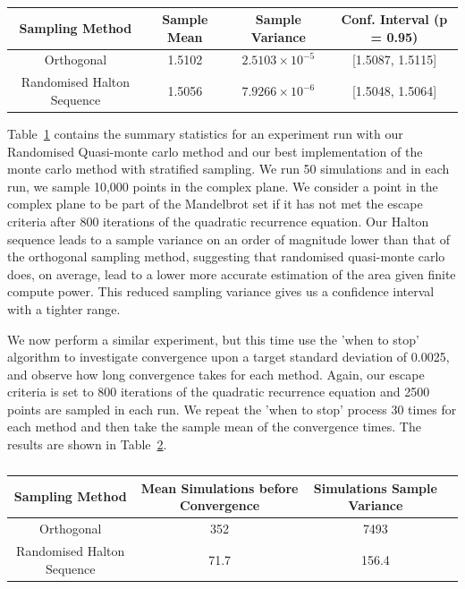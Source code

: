 \documentclass{article}
\begin{document}
    \begin{table}[h!]
        \centering
        \begin{tabular}{|c | c | c | c|}
            \hline
            Sampling Method & Sample Mean & Sample Variance & Conf. Interval (p = 0.95) \\
            \hline\hline
            Orthogonal & 1.5102 & $2.5103 \times 10^{-5}$ & [1.5087, 1.5115] \\
            Randomised Halton Sequence & 1.5056 & $7.9266 \times 10^{-6}$ & [1.5048, 1.5064] \\
            \hline
        \end{tabular}
        \caption{}
        \label{Table:q4_fixedsim}
    \end{table}

    Table~\ref{Table:q4_fixedsim} contains the summary statistics for an experiment run with our Randomised Quasi-monte carlo method and our best implementation of the monte carlo method with stratified sampling. We run 50 simulations and in each run, we sample 10,000 points in the complex plane. We consider a point in the complex plane to be part of the Mandelbrot set if it has not met the escape criteria after 800 iterations of the quadratic recurrence equation. Our Halton sequence leads to a sample variance on an order of magnitude lower than that of the orthogonal sampling method, suggesting that randomised quasi-monte carlo does, on average, lead to a lower more accurate estimation of the area given finite compute power. This reduced sampling variance gives us a confidence interval with a tighter range.

    We now perform a similar experiment, but this time use the 'when to stop' algorithm to investigate convergence upon a target standard deviation of 0.0025, and observe how long convergence takes for each method. Again, our escape criteria is set to 800 iterations of the quadratic recurrence equation and 2500 points are sampled in each run. We repeat the 'when to stop' process 30 times for each method and then take the sample mean of the convergence times. The results are shown in Table~\ref{Table:q4conv}.

    \begin{table}[h!]
        \centering
        \begin{tabular}{|c | c | c | c|}
            \hline
            Sampling Method & Mean Simulations before Convergence & Simulations Sample Variance\\
            \hline\hline
            Orthogonal & 352 & 7493 \\
            Randomised Halton Sequence & 71.7 & 156.4 \\
            \hline
        \end{tabular}
        \caption{}
        \label{Table:q4conv}
    \end{table}
\end{document}

